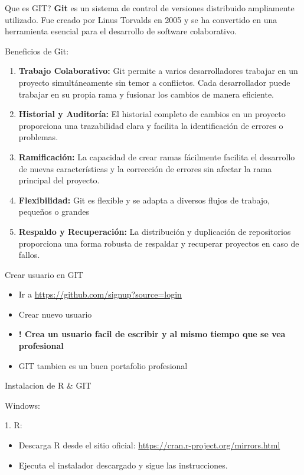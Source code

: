 \documentclass[
  ignorenonframetext,
]{beamer}
\providecommand{\tightlist}{%
  \setlength{\itemsep}{0pt}\setlength{\parskip}{0pt}}
\begin{document}
\begin{frame}[fragile]{Que es GIT?}
\protect\hypertarget{que-es-git}{}
\textbf{Git} es un sistema de control de versiones distribuido
ampliamente utilizado. Fue creado por Linus Torvalds en 2005 y se ha
convertido en una herramienta esencial para el desarrollo de software
colaborativo.

\begin{block}{Beneficios de Git:}
\protect\hypertarget{beneficios-de-git}{}
\begin{enumerate}
\item
  \textbf{Trabajo Colaborativo:} Git permite a varios desarrolladores
  trabajar en un proyecto simultáneamente sin temor a conflictos. Cada
  desarrollador puede trabajar en su propia rama y fusionar los cambios
  de manera eficiente.
\item
  \textbf{Historial y Auditoría:} El historial completo de cambios en un
  proyecto proporciona una trazabilidad clara y facilita la
  identificación de errores o problemas.
\item
  \textbf{Ramificación:} La capacidad de crear ramas fácilmente facilita
  el desarrollo de nuevas características y la corrección de errores sin
  afectar la rama principal del proyecto.
\item
  \textbf{Flexibilidad:} Git es flexible y se adapta a diversos flujos
  de trabajo, pequeños o grandes
\item
  \textbf{Respaldo y Recuperación:} La distribución y duplicación de
  repositorios proporciona una forma robusta de respaldar y recuperar
  proyectos en caso de fallos.
\end{enumerate}
\end{block}

\begin{block}{Crear usuario en GIT}
\protect\hypertarget{crear-usuario-en-git}{}
\begin{itemize}
\tightlist
\item
  Ir a \url{https://github.com/signup?source=login}
\item
  Crear nuevo usuario
\item
  \textbf{! Crea un usuario facil de escribir y al mismo tiempo que se
  vea profesional}
\item
  GIT tambien es un buen portafolio profesional
\end{itemize}
\end{block}

\begin{block}{Instalacion de R \& GIT}
\protect\hypertarget{instalacion-de-r-git}{}
\begin{block}{Windows:}
\protect\hypertarget{windows}{}
\begin{block}{1. R:}
\protect\hypertarget{r}{}
\begin{itemize}
\tightlist
\item
  Descarga R desde el sitio oficial:
  \url{https://cran.r-project.org/mirrors.html}
\item
  Ejecuta el instalador descargado y sigue las instrucciones.
\end{itemize}
\end{block}


\end{block}
\end{block}
\end{frame}
\end{document}
